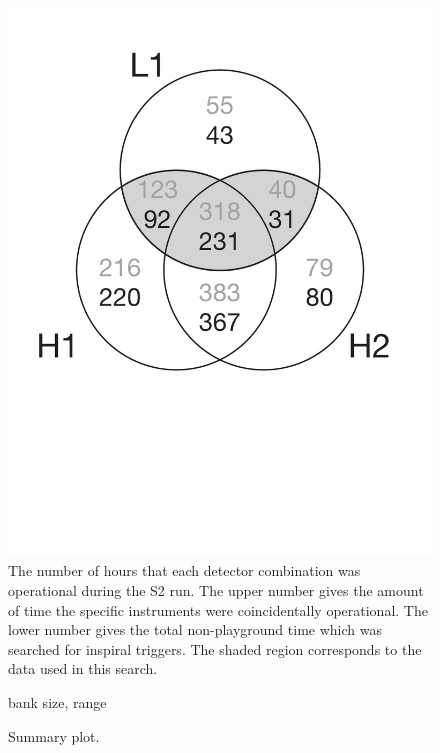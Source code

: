 \begin{figure}[p]
\begin{center}
\includegraphics[width=\linewidth]{figures/result/s2_times}
\end{center}
\caption{\label{f:S2times}%
The number of hours that each detector combination was operational during the
S2 run.  The upper number gives the amount of time the specific instruments
were coincidentally operational.  The lower number gives the total
non-playground time which was searched for inspiral triggers.  The shaded
region corresponds to the data used in this search.}
\end{figure}

\begin{figure}[p]
\begin{center}
bank size, range
\end{center}
\caption{\label{f:inspiral_summary}%
Summary plot.}
\end{figure}


